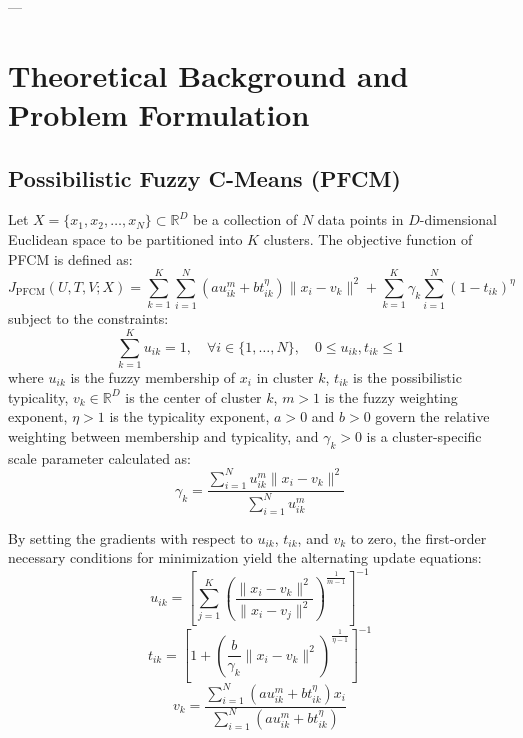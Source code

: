 \documentclass[preprint,12pt]{elsarticle}
\begin{document}
---

\section{Theoretical Background and Problem Formulation}
\label{sec:background}

\subsection{Possibilistic Fuzzy C-Means (PFCM)}
Let $X = \{x_1, x_2, \dots, x_N\} \subset \mathbb{R}^D$ be a collection of $N$ data points in $D$-dimensional Euclidean space to be partitioned into $K$ clusters. The objective function of PFCM \cite{pal2005possibilistic} is defined as:
\begin{equation}
J_{\text{PFCM}}(U, T, V; X) = \sum_{k=1}^K \sum_{i=1}^N \left( a u_{ik}^m + b t_{ik}^\eta \right) \|x_i - v_k\|^2 + \sum_{k=1}^K \gamma_k \sum_{i=1}^N (1 - t_{ik})^\eta
\label{eq:pfcm_obj}
\end{equation}
subject to the constraints:
\begin{equation}
\sum_{k=1}^K u_{ik} = 1, \quad \forall i \in \{1, \dots, N\}, \quad 0 \le u_{ik}, t_{ik} \le 1
\end{equation}
where $u_{ik}$ is the fuzzy membership of $x_i$ in cluster $k$, $t_{ik}$ is the possibilistic typicality, $v_k \in \mathbb{R}^D$ is the center of cluster $k$, $m > 1$ is the fuzzy weighting exponent, $\eta > 1$ is the typicality exponent, $a > 0$ and $b > 0$ govern the relative weighting between membership and typicality, and $\gamma_k > 0$ is a cluster-specific scale parameter calculated as:
\begin{equation}
\gamma_k = \frac{\sum_{i=1}^N u_{ik}^m \|x_i - v_k\|^2}{\sum_{i=1}^N u_{ik}^m}
\end{equation}

By setting the gradients with respect to $u_{ik}$, $t_{ik}$, and $v_k$ to zero, the first-order necessary conditions for minimization yield the alternating update equations:
\begin{equation}
u_{ik} = \left[ \sum_{j=1}^K \left( \frac{\|x_i - v_k\|^2}{\|x_i - v_j\|^2} \right)^{\frac{1}{m-1}} \right]^{-1}
\label{eq:u_update}
\end{equation}
\begin{equation}
t_{ik} = \left[ 1 + \left( \frac{b}{\gamma_k} \|x_i - v_k\|^2 \right)^{\frac{1}{\eta-1}} \right]^{-1}
\label{eq:t_update}
\end{equation}
\begin{equation}
v_k = \frac{\sum_{i=1}^N (a u_{ik}^m + b t_{ik}^\eta) x_i}{\sum_{i=1}^N (a u_{ik}^m + b t_{ik}^\eta)}
\label{eq:v_update}
\end{equation}
\end{document}
